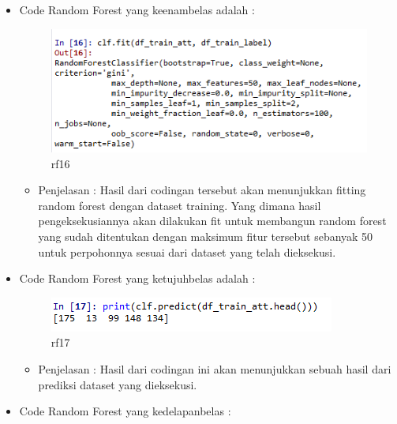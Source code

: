 \begin{enumerate}
\begin{itemize}
\begin{itemize}
\end{itemize}
\item Code Random Forest yang keenambelas adalah :
\par
\begin{figure}[ht]
\centering
\includegraphics[scale=0.4]{figures/rf16.png}
\caption{rf16}
\label{contoh}
\end{figure}
\par
\begin{itemize}
\item Penjelasan : Hasil dari codingan tersebut akan menunjukkan fitting random forest dengan dataset training. Yang dimana hasil pengeksekusiannya akan dilakukan fit untuk membangun random forest yang sudah ditentukan dengan maksimum fitur tersebut sebanyak 50 untuk perpohonnya sesuai dari dataset yang telah dieksekusi.
\par
\par
\end{itemize}
\item Code Random Forest yang ketujuhbelas adalah :
\par
\begin{figure}[ht]
\centering
\includegraphics[scale=0.4]{figures/rf17.png}
\caption{rf17}
\label{contoh}
\end{figure}
\par
\begin{itemize}
\item Penjelasan : Hasil dari codingan ini akan menunjukkan sebuah hasil dari prediksi dataset yang dieksekusi. 
\par
\par
\end{itemize}
\item Code Random Forest yang kedelapanbelas :
\par
\begin{figure}[ht]
\centering

\end{figure}
\end{itemize}
\end{enumerate}
